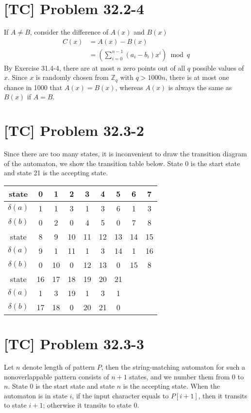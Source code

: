 \documentclass[a4paper,11pt,twocolumn]{article}
\begin{document}
  \section{[TC] Problem 32.2-4}
  If $A \neq B$, consider the difference of $A(x)$ and $B(x)$
  \begin{align*}
    C(x) &= A(x) - B(x) \\
    &= \left(\sum_{i=0}^{n-1}(a_i-b_i)x^i \right) \bmod q
  \end{align*}
  By Exercise 31.4-4, there are at most $n$ zero points out of all $q$ possible values of $x$. Since $x$ is randomly chosen from $\mathbb{Z}_q$ with $q > 1000n$, there is at most one chance in 1000 that $A(x) = B(x)$, whereas $A(x)$ is always the same as $B(x)$ if $A = B$.
  
  \section{[TC] Problem 32.3-2}
  Since there are too many states, it is inconvenient to draw the transition diagram of the automaton, we show the transition table below. State 0 is the start state and state 21 is the accepting state.
  \begin{table}[h]
    \begin{tabular}{c|cccccccc}
      \hline
      state & 0 & 1 & 2 & 3 & 4 & 5 & 6 & 7 \\ \hline
      $\delta(a)$ & 1 & 1 & 3 & 1 & 3 & 6 & 1 & 3 \\
      $\delta(b)$ & 0 & 2 & 0 & 4 & 5 & 0 & 7 & 8 \\ \hline
      state & 8 & 9 & 10 & 11 & 12 & 13 & 14 & 15 \\ \hline
      $\delta(a)$ & 9 & 1 & 11 & 1 & 3 & 14 & 1 & 16 \\
      $\delta(b)$ & 0 & 10 & 0 & 12 & 13 & 0 & 15 & 8 \\ \hline
      state & 16 & 17 & 18 & 19 & 20 & 21  \\ \hline
      $\delta(a)$ & 1 & 3 & 19 & 1 & 3 & 1 \\
      $\delta(b)$ & 17 & 18 & 0 & 20 & 21 & 0 \\
      \hline
    \end{tabular}
  \end{table}
  
  \section{[TC] Problem 32.3-3}
  Let $n$ denote length of pattern $P$, then the string-matching automaton for such a nonoverlappable pattern consists of $n+1$ states, and we number them from 0 to $n$. State 0 is the start state and state $n$ is the accepting state. When the automaton is in state $i$, if the input character equals to $P[i+1]$, then it transits to state $i+1$; otherwise it transits to state $0$.
  
\end{document}
